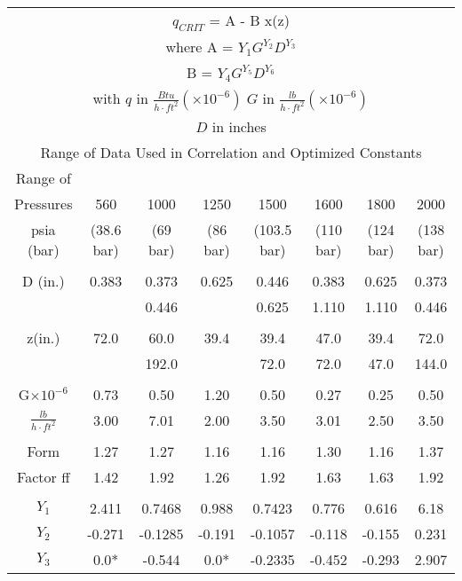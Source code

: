 \documentclass[12pt,fleqn]{report}
\begin{document}
{\newpage
\clearpage
\samepage \begin{tabular}{*{8}{c}}
\multicolumn{8}{c}{$q_{CRIT}$ = A - B x(z)}\\  [2mm]
\multicolumn{8}{c}{where A = $Y_{1}G^{Y_{2}}D^{Y_{3}}$}\\  [2mm]
\multicolumn{8}{c}{\hspace{4mm} B =  $Y_{4}G^{Y_{5}}D^{Y_{6}}$}\\  [2mm]
\multicolumn{8}{c}{with $q$ in $\frac{Btu}{h\cdot ft^{2}} \left( \times 10^{-6} \right) \; G$ in $\frac{lb}{h\cdot ft^{2}} \left( \times 10^{-6} \right)$} \\  [2mm]
\multicolumn{8}{c}{$D$ in inches}\\  [2mm]
\multicolumn{8}{c}{Range of Data Used in Correlation and Optimized Constants} \\  [4mm] \hline
Range of & & & & & & & \\ 
Pressures & 560 & 1000 & 1250 & 1500 & 1600 & 1800 & 2000 \\ 
psia (bar) & (38.6 bar) & (69 bar) & (86 bar) & (103.5 bar) & (110 bar) & (124 bar) &(138 bar)\\  [2mm] \hline
& & & & & & & \\ 
D (in.) & 0.383 & 0.373 & 0.625 & 0.446 & 0.383 & 0.625 & 0.373 \\ 
 & & 0.446 & & 0.625 & 1.110 & 1.110 & 0.446 \\ [2mm] \hline
 & & & & & & & \\ 
z(in.) & 72.0 & 60.0 & 39.4 & 39.4 & 47.0 & 39.4 & 72.0\\ 
 & & 192.0 & & 72.0 & 72.0 & 47.0 & 144.0\\  [2mm] \hline
 & & & & & & & \\ 
G$\times 10^{-6}$ & 0.73 & 0.50 & 1.20 & 0.50 & 0.27 & 0.25 & 0.50 \\ 
$\frac{lb}{h\cdot ft^{2}}$ & 3.00 & 7.01 & 2.00 & 3.50 & 3.01 & 2.50 & 3.50\\  [2mm] \hline
 & & & & & & & \\ 
Form & 1.27 & 1.27 & 1.16 & 1.16 & 1.30 & 1.16 & 1.37\\ 
Factor ff & 1.42 & 1.92 & 1.26 & 1.92 & 1.63 & 1.63 & 1.92 \\  [2mm] \hline
 & & & & & & & \\ 
$Y_{1}$ & 2.411 & 0.7468 & 0.988 & 0.7423 & 0.776 & 0.616 & 6.18\\ 
$Y_{2}$ & -0.271 & -0.1285 & -0.191 & -0.1057 & -0.118 & -0.155 & 0.231\\ 
$Y_{3}$ & 0.0* & -0.544 & 0.0* & -0.2335& -0.452 & -0.293 & 2.907\\ 

\end{tabular}}
\end{document}

